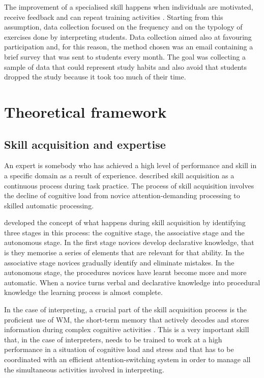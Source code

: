 \documentclass[output=paper]{../langscibook}
\begin{document}
The improvement of a specialised skill happens when individuals are motivated, receive feedback and can repeat training activities \citep{EricssonEtAl1993}. Starting from this assumption, data collection focused on the frequency and on the typology of exercises done by interpreting students. Data collection aimed also at favouring participation and, for this reason, the method chosen was an email containing a brief survey that was sent to students every month. The goal was collecting a sample of data that could represent study habits and also avoid that students dropped the study because it took too much of their time.~


\section{Theoretical framework}


\subsection{Skill acquisition and expertise}



An expert is somebody who has achieved a high level of performance and skill in a specific domain as a result of experience. \citet[290]{Ackerman1988} described skill acquisition as a continuous process during task practice. The process of skill acquisition involves the decline of cognitive load from novice attention-demanding processing to skilled automatic processing.

\citet{Anderson1995} developed the concept of what happens during skill acquisition by identifying three stages in this process: the cognitive stage, the associative stage and the autonomous stage. In the first stage novices develop declarative knowledge, that is they memorise a series of elements that are relevant for that ability. In the associative stage novices gradually identify and eliminate mistakes. In the autonomous stage, the procedures novices have learnt become more and more automatic. When a novice turns verbal and declarative knowledge into procedural knowledge the learning process is almost complete.

In the case of interpreting, a crucial part of the skill acquisition process is the proficient use of WM, the short-term memory that actively decodes and stores information during complex cognitive activities \citep{Baddeley1997}. This is a very important skill that, in the case of interpreters, needs to be trained to work at a high performance in a situation of cognitive load and stress and that has to be coordinated with an efficient attention-switching system in order to manage all the simultaneous activities involved in interpreting.
\end{document}
